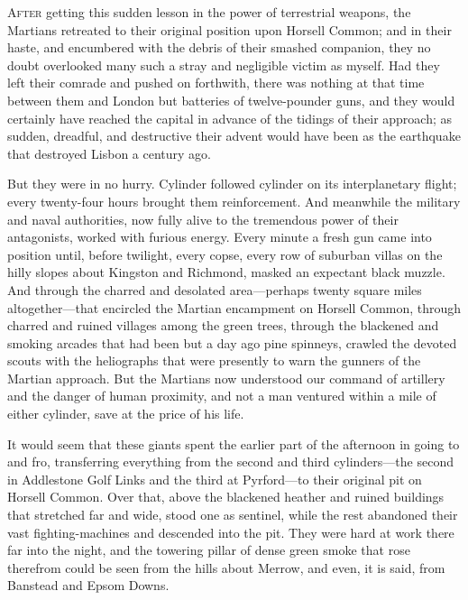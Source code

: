 


\lettrine[lines=4,findent=2pt]{A}{fter} getting this sudden lesson in the power of terrestrial weapons, the Martians retreated to their original position upon Horsell Common; and in their haste, and encumbered with the debris of their smashed companion, they no doubt overlooked many such a stray and negligible victim as myself. Had they left their comrade and pushed on forthwith, there was nothing at that time between them and London but batteries of twelve-pounder guns, and they would certainly have reached the capital in advance of the tidings of their approach; as sudden, dreadful, and destructive their advent would have been as the earthquake that destroyed Lisbon a century ago.

But they were in no hurry. Cylinder followed cylinder on its interplanetary flight; every twenty-four hours brought them reinforcement. And meanwhile the military and naval authorities, now fully alive to the tremendous power of their antagonists, worked with furious energy. Every minute a fresh gun came into position until, before twilight, every copse, every row of suburban villas on the hilly slopes about Kingston and Richmond, masked an expectant black muzzle. And through the charred and desolated area—perhaps twenty square miles altogether—that encircled the Martian encampment on Horsell Common, through charred and ruined villages among the green trees, through the blackened and smoking arcades that had been but a day ago pine spinneys, crawled the devoted scouts with the heliographs that were presently to warn the gunners of the Martian approach. But the Martians now understood our command of artillery and the danger of human proximity, and not a man ventured within a mile of either cylinder, save at the price of his life.

It would seem that these giants spent the earlier part of the afternoon in going to and fro, transferring everything from the second and third cylinders—the second in Addlestone Golf Links and the third at Pyrford—to their original pit on Horsell Common. Over that, above the blackened heather and ruined buildings that stretched far and wide, stood one as sentinel, while the rest abandoned their vast fighting-machines and descended into the pit. They were hard at work there far into the night, and the towering pillar of dense green smoke that rose therefrom could be seen from the hills about Merrow, and even, it is said, from Banstead and Epsom Downs.

